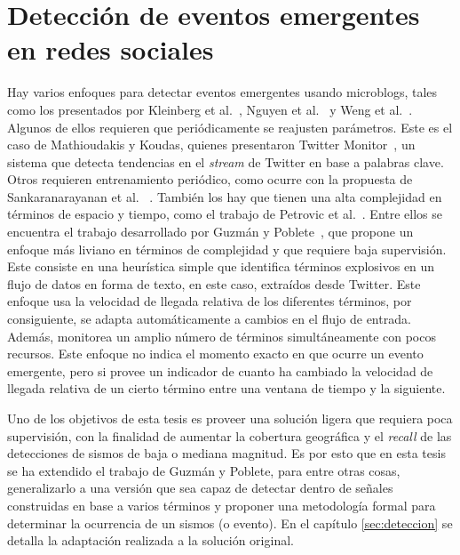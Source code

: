 \section{Detección de eventos emergentes en redes sociales}
\label{sec:deteccioneventos}

Hay varios enfoques para detectar eventos emergentes usando microblogs, tales como los presentados por Kleinberg et al.~\cite{kleinberg2003bursty}, Nguyen et al.~\cite{nguyen2013event} y Weng et al.~\cite{weng2011event}.
%
Algunos de ellos requieren que periódicamente se reajusten parámetros. Este es el caso de Mathioudakis y Koudas, quienes presentaron Twitter Monitor~\cite{mathioudakis2010twittermonitor}, un sistema que detecta tendencias en el {\em stream} de Twitter en base a palabras clave.
%
Otros requieren entrenamiento periódico, como ocurre con la propuesta de Sankaranarayanan et al.~ \cite{sankaranarayanan2009twitterstand}. 
%
También los hay que tienen una alta complejidad en términos de espacio y tiempo, como el trabajo de Petrovic et al.~\cite{petrovic2010streaming}.
%
Entre ellos se encuentra el trabajo desarrollado por Guzmán y Poblete~\cite{guzman2013line}, que propone un enfoque más liviano en términos de complejidad y que requiere baja supervisión.
%
Este consiste en una heurística simple que identifica términos explosivos en un flujo de datos en forma de texto, en este caso, extraídos desde Twitter. 
%
Este enfoque usa la velocidad de llegada relativa de los diferentes términos, por consiguiente, se adapta automáticamente a cambios en el flujo de entrada. 
%
Además, monitorea un amplio número de términos simultáneamente con pocos recursos.
%
Este enfoque no indica el momento exacto en que ocurre un evento emergente, pero si provee un indicador de cuanto ha cambiado la velocidad de llegada relativa de un cierto término entre una ventana de tiempo y la siguiente.


Uno de los objetivos de esta tesis es proveer una solución ligera que requiera poca supervisión, con la finalidad de aumentar la cobertura geográfica y el {\em recall} de las detecciones de sismos de baja o mediana magnitud.
%
Es por esto que en esta tesis se ha extendido el trabajo de Guzmán y Poblete, para entre otras cosas, generalizarlo a una versión que sea capaz de detectar dentro de señales construidas en base a varios términos y proponer una metodología formal para determinar la ocurrencia de un sismos (o evento).
%
En el capítulo \ref{sec:deteccion} se detalla la adaptación realizada a la solución original. 

